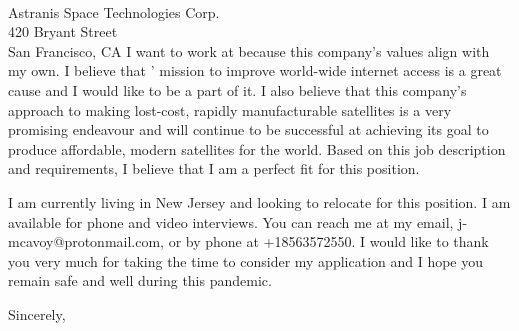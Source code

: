 \documentclass[11pt]{letter} %
\begin{document}
\begin{letter}{\\
Astranis Space Technologies Corp.\\
420 Bryant Street\\
San Francisco, CA}
I want to work at {\company} because this company's values
align with my own. I believe that {\company}' mission to improve world-wide internet
access is a great cause and I would like to be a part of it. I also believe
that this company's approach to making lost-cost, rapidly manufacturable
satellites is a very promising endeavour and will continue to be successful
at achieving its goal to produce affordable, modern satellites for the world.
Based on this job description and requirements, I believe that I am a perfect
fit for this position.

{\lifestory}

I am currently living in New Jersey and looking to relocate for this position. I
am available for phone and video interviews. You can reach me at my email,
j-mcavoy@protonmail.com, or by phone at +18563572550. I would like to thank you
very much for taking the time to consider my application and I hope you remain safe
and well during this pandemic.

\closing{Sincerely,}




\end{letter}
\end{document}
